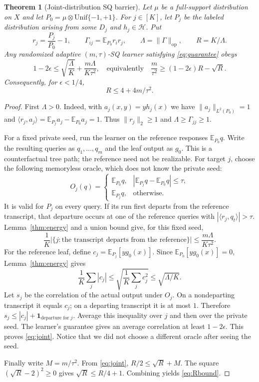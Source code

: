 \documentclass[11pt]{article}
\newtheorem{theorem}{Theorem}
\newcommand{\E}{\mathbb E}
\newcommand{\1}{\mathbf 1}
\newcommand{\cH}{\mathcal H}
\newcommand{\op}{\mathrm{op}}
\begin{document}
\begin{theorem}[Joint-distribution SQ barrier]\label{thm:barrier}
Let $\mu$ be a full-support distribution on $X$ and let $P_0=\mu\otimes\mathrm{Unif}\{-1,+1\}$. For $j\in[K]$, let $P_j$ be the labeled distribution arising from some $D_j$ and $h_j\in\cH$. Put
\[
 r_j=\frac{P_j}{P_0}-1,\qquad
 \Gamma_{ij}=\E_{P_0}r_i r_j,\qquad
 \Lambda=\|\Gamma\|_\op,\qquad R=K/\Lambda.
\]
Any randomized adaptive $(m,\tau)$-SQ learner satisfying \eqref{eq:guarantee} obeys
\begin{equation}\label{eq:joint}
 1-2\epsilon\leq\sqrt{\frac\Lambda K}+
 \frac{m\Lambda}{K\tau^2},
 \quad\text{equivalently}\quad
 \frac m{\tau^2}\geq(1-2\epsilon)R-\sqrt R.
\end{equation}
Consequently, for $\epsilon<1/4$,
\begin{equation}\label{eq:Rbound}
 R\leq4+4m/\tau^2.
\end{equation}
\end{theorem}
\begin{proof}
First $\Lambda>0$. Indeed, with $a_j(x,y)=y h_j(x)$ we have $\|a_j\|_{L^2(P_0)}=1$ and
$\langle r_j,a_j\rangle=\E_{P_j}a_j-\E_{P_0}a_j=1$. Thus $\|r_j\|_2\geq1$ and $\Lambda\geq\Gamma_{jj}\geq1$.

For a fixed private seed, run the learner on the reference responses $\E_{P_0}q$. Write the resulting queries as $q_1,\ldots,q_m$ and the leaf output as $g_0$. This is a counterfactual tree path; the reference need not be realizable. For target $j$, choose the following memoryless oracle, which does not know the private seed:
\[
 O_j(q)=
 \begin{cases}
 \E_{P_0}q,&|\E_{P_j}q-\E_{P_0}q|\leq\tau,\\
 \E_{P_j}q,&\text{otherwise}.
 \end{cases}
\]
It is valid for $P_j$ on every query. If its run first departs from the reference transcript, that departure occurs at one of the reference queries with $|\langle r_j,q_t\rangle|>\tau$. Lemma~\ref{thm:energy} and a union bound give, for this fixed seed,
\[
 \frac1K\bigl|\{j:\text{the transcript departs from the reference}\}\bigr|
 \leq\frac{m\Lambda}{K\tau^2}.
\]
For the reference leaf, define $c_j=\E_{P_j}[y g_0(x)]$. Since $\E_{P_0}[y g_0(x)]=0$, Lemma~\ref{thm:energy} gives
\[
 \frac1K\sum_j|c_j|\leq
 \sqrt{\frac1K\sum_jc_j^2}\leq\sqrt{\Lambda/K}.
\]
Let $s_j$ be the correlation of the actual output under $O_j$. On a nondeparting transcript it equals $c_j$; on a departing transcript it is at most $1$. Therefore
$s_j\leq|c_j|+\1_{\text{departure for }j}$.
Average this inequality over $j$ and then over the private seed. The learner's guarantee gives an average correlation at least $1-2\epsilon$. This proves \eqref{eq:joint}. Notice that we did not choose a different oracle after seeing the seed.

Finally write $M=m/\tau^2$. From \eqref{eq:joint}, $R/2\leq\sqrt R+M$. The square $(\sqrt R-2)^2\geq0$ gives $\sqrt R\leq R/4+1$. Combining yields \eqref{eq:Rbound}.
\end{proof}
\end{document}
